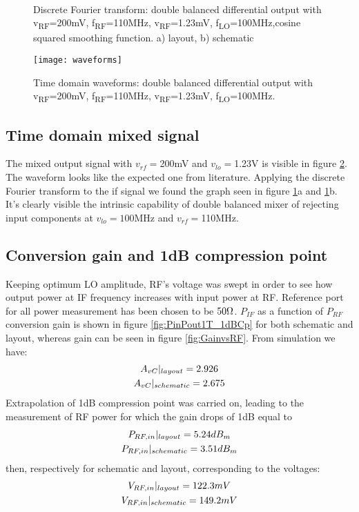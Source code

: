 \begin{figure}[H] 
	\centering
	 \\
	\caption{Discrete Fourier transform: double balanced differential output with v\textsubscript{RF}=200mV,  f\textsubscript{RF}=110MHz, v\textsubscript{RF}=1.23mV, f\textsubscript{LO}=100MHz,cosine squared smoothing function. a) layout, b) schematic}
	\label{fig:TdomaniDFT}
\end{figure}

\begin{figure}[H]
	\centering
	\texttt{[image: waveforms]}
	\caption{Time domain waveforms: double balanced differential output with v\textsubscript{RF}=200mV,  f\textsubscript{RF}=110MHz, v\textsubscript{RF}=1.23mV, f\textsubscript{LO}=100MHz.}
	\label{fig:TdomaniWF}
\end{figure}

\subsection{Time domain mixed signal}
The mixed output signal with \(v_{rf}=\)200mV and \(v_{lo}=\)1.23V is visible in figure \ref{fig:TdomaniWF}. The waveform looks like the expected one from literature.
Applying the discrete Fourier transform to the if signal we found the graph seen in figure \ref{fig:TdomaniDFT}a and \ref{fig:TdomaniDFT}b.
It's clearly visible the intrinsic capability of double balanced mixer of rejecting input components at \(v_{lo}=100\)MHz and \(v_{rf}=\)110MHz.

\subsection{Conversion gain and 1dB compression point}
Keeping optimum LO amplitude, RF's voltage was swept in order to see how output power at IF frequency increases with input power at RF. Reference port for all power measurement has been chosen to be \(50\ohm\). \(P_{IF}\) as a function of \(P_{RF}\) conversion gain is shown in figure \ref{fig:PinPout1T_1dBCp} for both schematic and layout, whereas gain can be seen in figure \ref{fig:GainvsRF}. 
From simulation we have:
\begin{gather}
A_{vC}|_{layout}=2.926 \notag \\ 
A_{vC}|_{schematic}=2.675 \notag
\end{gather}
Extrapolation of 1dB compression point was carried on, leading to the measurement of RF power for which the gain drops of 1dB equal to 
\begin{gather}
P_{RF,in}|_{layout}=5.24dB_{m} \notag \\
P_{RF,in}|_{schematic}=3.51dB_{m} \notag
\end{gather}
then, respectively for schematic and layout, corresponding to the voltages:
\begin{gather}
V_{RF,in}|_{layout}=122.3mV \notag \\
V_{RF,in}|_{schematic}=149.2mV \notag
\end{gather}



